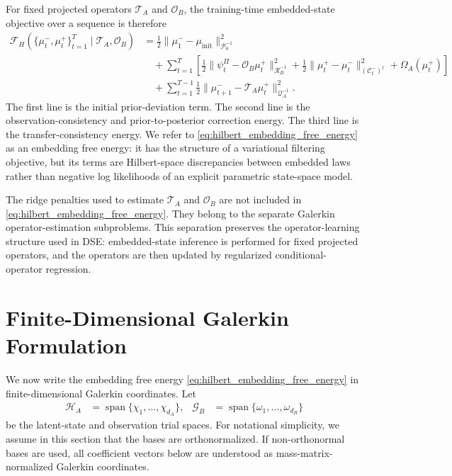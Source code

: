 \documentclass[twoside,11pt]{article}
\begin{document}
For fixed projected operators $\mathcal T_A$ and $\mathcal O_B$, the
training-time embedded-state objective over a sequence is therefore
\begin{align}
\mathcal F_H
(\{\mu_t^-,\mu_t^+\}_{t=1}^T
\mid
\mathcal T_A,\mathcal O_B)
&=
\frac12
\|\mu_1^- - \mu_{\mathrm{init}}\|_{\mathcal P_0^{-1}}^2
\nonumber\\
&\quad+
\sum_{t=1}^T
\left[
\frac12
\|\psi_t^\Pi-\mathcal O_B\mu_t^+\|_{\mathcal R_B^{-1}}^2
+
\frac12
\|\mu_t^+ - \mu_t^-\|_{(\mathcal C_t^-)^\dagger}^2
+
\Omega_A(\mu_t^+)
\right]
\nonumber\\
&\quad+
\sum_{t=1}^{T-1}
\frac12
\|\mu_{t+1}^- - \mathcal T_A\mu_t^+\|_{\mathcal Q_A^{-1}}^2 .
\label{eq:hilbert_embedding_free_energy}
\end{align}
The first line is the initial prior-deviation term. The second line is
the observation-consistency and prior-to-posterior correction energy.
The third line is the transfer-consistency energy. We refer to
\eqref{eq:hilbert_embedding_free_energy} as an embedding free energy:
it has the structure of a variational filtering objective, but its
terms are Hilbert-space discrepancies between embedded laws rather than
negative log likelihoods of an explicit parametric state-space model.

The ridge penalties used to estimate $\mathcal T_A$ and $\mathcal O_B$
are not included in \eqref{eq:hilbert_embedding_free_energy}. They
belong to the separate Galerkin operator-estimation subproblems. This
separation preserves the operator-learning structure used in DSE:
embedded-state inference is performed for fixed projected operators,
and the operators are then updated by regularized conditional-operator
regression.


\section{Finite-Dimensional Galerkin Formulation}
\label{sec:finite_galerkin_formulation}

We now write the embedding free energy
\eqref{eq:hilbert_embedding_free_energy} in finite-dimensional Galerkin
coordinates. Let
\begin{align}
\mathcal H_A
&=
\operatorname{span}\{\chi_1,\dots,\chi_{d_A}\},
&
\mathcal G_B
&=
\operatorname{span}\{\omega_1,\dots,\omega_{d_B}\}
\label{eq:finite_trial_spaces}
\end{align}
be the latent-state and observation trial spaces. For notational
simplicity, we assume in this section that the bases are
orthonormalized. If non-orthonormal bases are used, all coefficient
vectors below are understood as mass-matrix-normalized Galerkin
coordinates.
\end{document}

